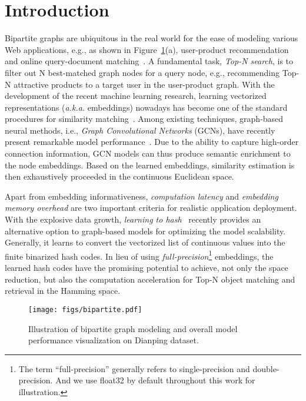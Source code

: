 \section{\textbf{Introduction}}

Bipartite graphs are ubiquitous in the real world for the ease of modeling various Web applications, e.g., as shown in Figure~\ref{fig:intro}(a), user-product recommendation~\cite{ma2020probabilistic,zhang2019star} and online query-document matching~\cite{zhang2019doc2hash}.
A fundamental task, \textit{Top-N search}, is to filter out N best-matched graph nodes for a query node, e.g., recommending Top-N attractive products to a target user in the user-product graph.
With the development of the recent machine learning research, learning vectorized representations (\textit{a.k.a.} embeddings) nowadays has become one of the standard procedures for similarity matching~\cite{grover2016node2vec,cheng2018aspect}.
Among existing techniques, graph-based neural methods, i.e., \textit{Graph Convolutional Networks} (GCNs), have recently present remarkable model performance~\cite{graphsage,lightgcn}.
Due to the ability to capture high-order connection information, GCN models can thus produce semantic enrichment to the node embeddings.
Based on the learned embeddings, similarity estimation is then exhaustively proceeded in the continuous Euclidean space.

 
Apart from embedding informativeness, \textit{computation latency} and \textit{embedding memory overhead} are two important criteria for realistic application deployment.
With the explosive data growth, \textit{learning to hash}~\cite{wang2017survey,jegou2010product} recently provides an alternative option to graph-based models for optimizing the model scalability.
Generally, it learns to convert the vectorized list of continuous values into the finite binarized hash codes.
In lieu of using \textit{full-precision}\footnote{\scriptsize The term ``full-precision'' generally refers to single-precision and double-precision. And we use float32 by default throughout this work for illustration.} 
embeddings, the learned hash codes have the promising potential to achieve, not only the space reduction, but also the computation acceleration for Top-N object matching and retrieval in the Hamming space.



\begin{figure}[tp]
\begin{minipage}{0.5\textwidth}
\texttt{[image: figs/bipartite.pdf]}
\end{minipage} 
\vspace{-0.1in}
\caption{Illustration of bipartite graph modeling and overall model performance visualization on Dianping dataset.}
\label{fig:intro}
\end{figure}

